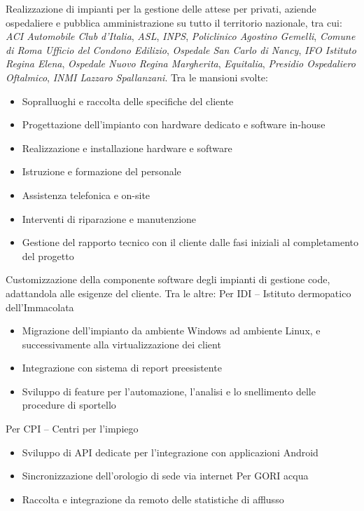 \documentclass[a4paper, 11pt]{moderncv}
\begin{document}
\vspace{3mm}
        {Realizzazione di impianti per la gestione delle attese per privati, aziende ospedaliere e pubblica 
          amministrazione su tutto il territorio nazionale, tra cui: \emph{ACI Automobile Club d'Italia}, \emph{ASL}, \emph{INPS}, \emph{Policlinico Agostino Gemelli}, \emph{Comune di Roma Ufficio del Condono Edilizio}, \emph{Ospedale San Carlo di Nancy}, \emph{IFO Istituto Regina Elena}, \emph{Ospedale Nuovo Regina Margherita}, \emph{Equitalia}, \emph{Presidio Ospedaliero Oftalmico}, \emph{INMI Lazzaro Spallanzani}.
          \vspace{10pt}
          Tra le mansioni svolte:
          \begin{itemize}
          \item Sopralluoghi e raccolta delle specifiche del cliente
          \item Progettazione dell'impianto con hardware dedicato e software in-house
          \item Realizzazione e installazione hardware e software
          \item Istruzione e formazione del personale
          \item Assistenza telefonica e on-site
          \item Interventi di riparazione e manutenzione
          \item Gestione del rapporto tecnico con il cliente dalle fasi iniziali al completamento del progetto
          \end{itemize}
          \vspace{10pt}
          Customizzazione della componente software degli impianti di gestione code, adattandola alle esigenze del cliente. Tra le altre:
          Per IDI – Istituto dermopatico dell'Immacolata
          \begin{itemize}
          \item Migrazione dell'impianto da ambiente Windows ad ambiente Linux, e successivamente alla virtualizzazione dei client
          \item Integrazione con sistema di report preesistente
          \item Sviluppo di feature per l'automazione, l'analisi e lo snellimento delle procedure di sportello
          \end{itemize}
          Per CPI – Centri per l'impiego
          \begin{itemize}
          \item Sviluppo di API dedicate per l'integrazione con applicazioni Android
          \item Sincronizzazione dell'orologio di sede via internet
            Per GORI acqua
          \item Raccolta e integrazione da remoto delle statistiche di afflusso
        \end{itemize}}
\end{document}
